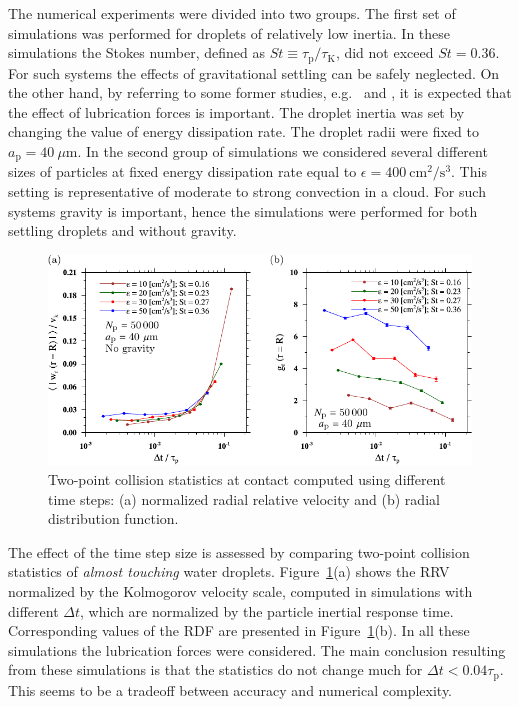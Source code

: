\documentclass[../thesis.tex]{subfiles}
\begin{document}
The numerical experiments were divided into two groups. The first set of simulations was performed for droplets of relatively low inertia. In these simulations the Stokes number, defined as $St\equiv\tau_\text{p}/ \tau_\text{K}$, did not exceed $St = 0.36$. For such systems the effects of gravitational settling can be safely neglected. On the other hand, by referring to some former studies, e.g.\ \citet{HJ70} and \citet{RWMG11}, it is expected that the effect of lubrication forces is important. The droplet inertia was set by changing the value of energy dissipation rate. The droplet radii were fixed to $a_\text{p} = 40~\mu$m. In the second group of simulations we considered several different sizes of particles at fixed energy dissipation rate equal to $\epsilon = 400~\mathrm{cm^2/s^3}$. This setting is representative of moderate to strong convection in a cloud. For such systems gravity is important, hence the simulations were performed for both settling droplets and without gravity.   

\begin{figure}%
\center
\includegraphics[width=\textwidth]{../figs/JFM/fig2.pdf}
\caption{Two-point collision statistics at contact computed using different time steps: (a) normalized radial relative velocity and (b) radial distribution function.}
\label{Fig2}
\end{figure}%

The effect of the time step size is assessed by comparing two-point collision statistics of \emph{almost touching} water droplets. Figure~\ref{Fig2}(a) shows the RRV normalized by the Kolmogorov velocity scale, computed in simulations with different $\Delta t$, which are normalized by the particle inertial response time. Corresponding values of the RDF are presented in Figure~\ref{Fig2}(b). In all these simulations the lubrication forces were considered. The main conclusion resulting from these simulations is that the statistics do not change much for $\Delta t < 0.04 \tau_\text{p}$. This seems to be a tradeoff between accuracy and numerical complexity.
\end{document}
